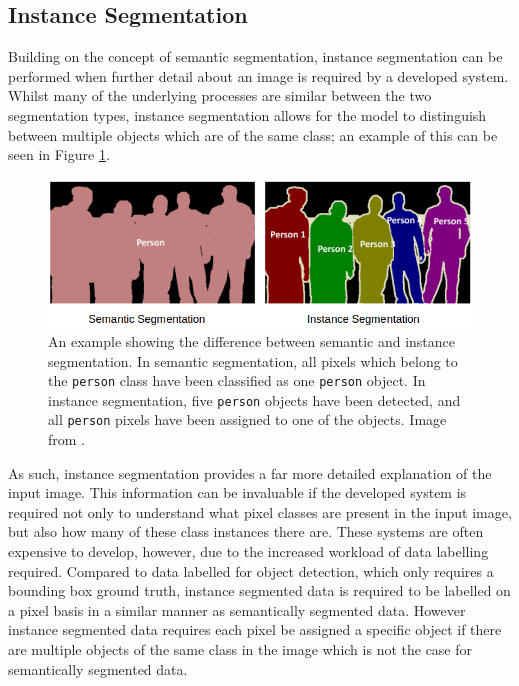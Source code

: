 \subsection{Instance Segmentation}\label{ch:Background,sec:instanceSegmentation}

Building on the concept of semantic segmentation, instance segmentation can be performed when further detail about an image is required by a developed system. Whilst many of the underlying processes are similar between the two segmentation types, instance segmentation allows for the model to distinguish between multiple objects which are of the same class; an example of this can be seen in Figure \ref{fig:instance-vs-semantic}. 

\begin{figure}
	\begin{center}
		\includegraphics[scale=0.5]{Chapter2/figs/semantic_vs_instance_segmentation.png}
	\end{center}
	\caption{An example showing the difference between semantic and instance segmentation. In semantic segmentation, all pixels which belong to the \texttt{person} class have been classified as one \texttt{person} object. In instance segmentation, five \texttt{person} objects have been detected, and all \texttt{person} pixels have been assigned to one of the objects. Image from \cite{sharma_image_2019}.}
	\label{fig:instance-vs-semantic}
\end{figure}

As such, instance segmentation provides a far more detailed explanation of the input image. This information can be invaluable if the developed system is required not only to understand what pixel classes are present in the input image, but also how many of these class instances there are. These systems are often expensive to develop, however, due to the increased workload of data labelling required. Compared to data labelled for object detection, which only requires a bounding box ground truth, instance segmented data is required to be labelled on a pixel basis in a similar manner as semantically segmented data. However instance segmented data requires each pixel be assigned a specific object if there are multiple objects of the same class in the image which is not the case for semantically segmented data.

